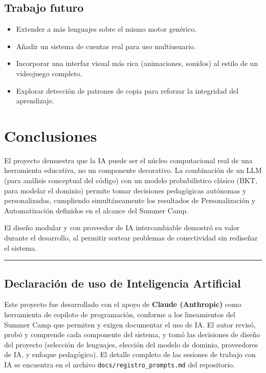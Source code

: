 \documentclass[11pt,letterpaper]{article}
\begin{document}
\subsection{Trabajo futuro}
\begin{itemize}[leftmargin=*]
  \item Extender a más lenguajes sobre el mismo motor genérico.
  \item Añadir un sistema de cuentas real para uso multiusuario.
  \item Incorporar una interfaz visual más rica (animaciones, sonidos)
  al estilo de un videojuego completo.
  \item Explorar detección de patrones de copia para reforzar la
  integridad del aprendizaje.
\end{itemize}

\section{Conclusiones}

El proyecto demuestra que la IA puede ser el núcleo computacional real
de una herramienta educativa, no un componente decorativo. La
combinación de un LLM (para análisis conceptual del código) con un
modelo probabilístico clásico (BKT, para modelar el dominio) permite
tomar decisiones pedagógicas autónomas y personalizadas, cumpliendo
simultáneamente los resultados de Personalización y Automatización
definidos en el alcance del Summer Camp.

El diseño modular y con proveedor de IA intercambiable demostró su
valor durante el desarrollo, al permitir sortear problemas de
conectividad sin rediseñar el sistema.

\vspace{1cm}
\noindent\rule{\textwidth}{0.4pt}

\subsection*{Declaración de uso de Inteligencia Artificial}
Este proyecto fue desarrollado con el apoyo de \textbf{Claude
(Anthropic)} como herramienta de copiloto de programación, conforme a
los lineamientos del Summer Camp que permiten y exigen documentar el
uso de IA. El autor revisó, probó y comprende cada componente del
sistema, y tomó las decisiones de diseño del proyecto (selección de
lenguajes, elección del modelo de dominio, proveedores de IA, y
enfoque pedagógico). El detalle completo de las sesiones de trabajo
con IA se encuentra en el archivo \texttt{docs/registro\_prompts.md}
del repositorio.
\end{document}
